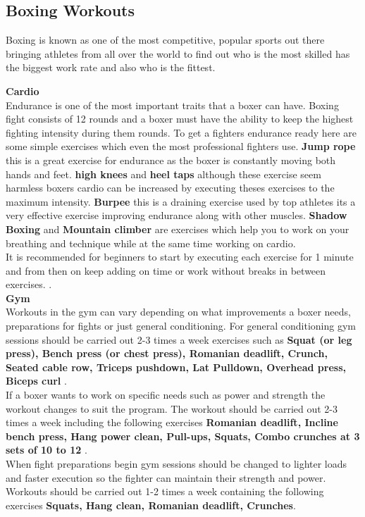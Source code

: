 \documentclass[a4paper,12pt,twoside]{report}
\begin{document}
\subsection{Boxing Workouts}
Boxing is known as one of the most competitive, popular sports out there bringing athletes from all over the world to find out who is the most skilled has the biggest work rate and also who is the fittest.

\textbf{Cardio}\\
Endurance is one of the most important traits that a boxer can have. Boxing fight consists of 12 rounds and a boxer must have the ability to keep the highest fighting intensity during them rounds.
To get  a fighters endurance ready here are some simple exercises which even the most professional fighters use.
\textbf{Jump rope} this is a great exercise for endurance as the boxer is constantly moving both hands and feet. \textbf{high knees} and \textbf{heel taps} although these exercise seem harmless boxers cardio can be increased by executing theses exercises to the maximum intensity. \textbf{Burpee} this is a draining exercise used by top athletes its a very effective exercise improving endurance along with other muscles. \textbf{Shadow Boxing} and \textbf{Mountain climber} are exercises which help you to work on your breathing and technique while at the same time working on cardio.\\
It is recommended for beginners to start by executing each exercise for 1 minute and from then on keep adding on time or work without breaks in between exercises. \cite{cardioWorkout}.\\

\textbf{Gym}\\
Workouts in the gym can vary depending on what improvements a boxer needs, preparations for fights or just general conditioning.
For general conditioning gym sessions should be carried out 2-3 times a week exercises such as 
   \textbf{Squat (or leg press), Bench press (or chest press), Romanian deadlift, Crunch, Seated cable row, Triceps pushdown, Lat Pulldown, Overhead press, Biceps curl
 }.\\
If a boxer wants to work on specific needs such as power and strength the workout changes to suit the program.
The workout should be carried out 2-3 times a week including the following exercises \textbf{Romanian deadlift, Incline bench press, Hang power clean, Pull-ups, Squats, Combo crunches at 3 sets of 10 to 12
}.\\
When fight preparations begin gym sessions should be changed to lighter loads and faster execution so the fighter can maintain their strength and power.
Workouts should be carried out 1-2 times a week containing the following exercises \textbf{Squats, Hang clean, Romanian deadlift, Crunches}.\cite{gymWorkout}\\
\end{document}
